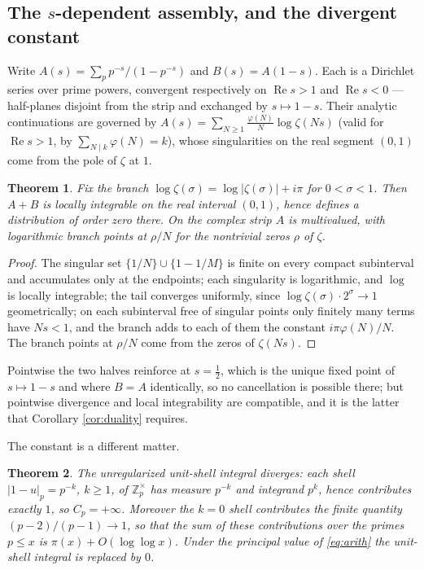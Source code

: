 \documentclass[11pt]{amsart}
\newtheorem{theorem}{Theorem}[section]
\theoremstyle{definition}
\theoremstyle{remark}
\newcommand{\Z}{\mathbb Z}
\newcommand{\Rel}{\operatorname{Re}}
\begin{document}
\subsection{The $s$-dependent assembly, and the divergent constant}

Write $A(s)=\sum_p p^{-s}/(1-p^{-s})$ and $B(s)=A(1-s)$.  Each is a Dirichlet
series over prime powers, convergent respectively on $\Rel s>1$ and
$\Rel s<0$ --- half-planes disjoint from the strip and exchanged by
$s\mapsto 1-s$.  Their analytic continuations are governed by
$A(s)=\sum_{N\ge1}\frac{\varphi(N)}{N}\log\zeta(Ns)$ (valid for $\Rel s>1$,
by $\sum_{N\mid k}\varphi(N)=k$), whose singularities on the real segment
$(0,1)$ come from the pole of $\zeta$ at $1$.

\begin{theorem}\label{thm:locint}
Fix the branch $\log\zeta(\sigma)=\log|\zeta(\sigma)|+i\pi$ for
$0<\sigma<1$.  Then $A+B$ is locally integrable on the real interval
$(0,1)$, hence defines a distribution of order zero there.  On the complex
strip $A$ is multivalued, with logarithmic branch points at $\rho/N$ for
the nontrivial zeros $\rho$ of $\zeta$.
\end{theorem}

\begin{proof}
The singular set $\{1/N\}\cup\{1-1/M\}$ is finite on every compact
subinterval and accumulates only at the endpoints; each singularity is
logarithmic, and $\log$ is locally integrable; the tail converges uniformly,
since $\log\zeta(\sigma)\cdot2^{\sigma}\to1$ geometrically; on each
subinterval free of singular points only finitely many terms have $Ns<1$,
and the branch adds to each of them the constant $i\pi\varphi(N)/N$.  The
branch points at $\rho/N$ come from the zeros of $\zeta(Ns)$.
\end{proof}

Pointwise the two
halves reinforce at $s=\tfrac12$, which is the unique fixed point of
$s\mapsto1-s$ and where $B=A$ identically, so no cancellation is possible
there; but pointwise divergence and local integrability are compatible, and
it is the latter that Corollary \ref{cor:duality} requires.

The constant is a different matter.

\begin{theorem}\label{thm:constant}
The unregularized unit-shell integral diverges: each shell
$|1-u|_p=p^{-k}$, $k\ge1$, of $\Z_p^\times$ has measure $p^{-k}$ and
integrand $p^{k}$, hence contributes exactly $1$, so $C_p=+\infty$.
Moreover the $k=0$ shell contributes the finite quantity
$(p-2)/(p-1)\to1$, so that the sum of these contributions over the primes
$p\le x$ is $\pi(x)+O(\log\log x)$.  Under the principal value of
\eqref{eq:arith} the unit-shell integral is replaced by $0$.
\end{theorem}
\end{document}
